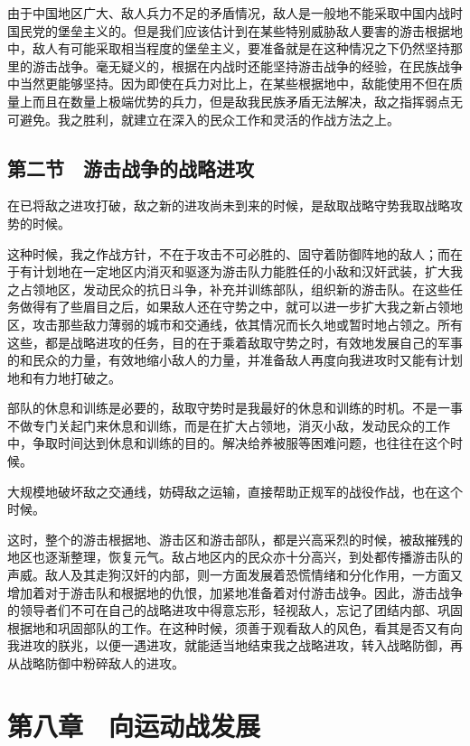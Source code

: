 由于中国地区广大、敌人兵力不足的矛盾情况，敌人是一般地不能采取中国内战时国民党的堡垒主义的。但是我们应该估计到在某些特别威胁敌人要害的游击根据地中，敌人有可能采取相当程度的堡垒主义，要准备就是在这种情况之下仍然坚持那里的游击战争。毫无疑义的，根据在内战时还能坚持游击战争的经验，在民族战争中当然更能够坚持。因为即使在兵力对比上，在某些根据地中，敌能使用不但在质量上而且在数量上极端优势的兵力，但是敌我民族矛盾无法解决，敌之指挥弱点无可避免。我之胜利，就建立在深入的民众工作和灵活的作战方法之上。

\subsection{第二节　游击战争的战略进攻}

在已将敌之进攻打破，敌之新的进攻尚未到来的时候，是敌取战略守势我取战略攻势的时候。

这种时候，我之作战方针，不在于攻击不可必胜的、固守着防御阵地的敌人；而在于有计划地在一定地区内消灭和驱逐为游击队力能胜任的小敌和汉奸武装，扩大我之占领地区，发动民众的抗日斗争，补充并训练部队，组织新的游击队。在这些任务做得有了些眉目之后，如果敌人还在守势之中，就可以进一步扩大我之新占领地区，攻击那些敌力薄弱的城市和交通线，依其情况而长久地或暂时地占领之。所有这些，都是战略进攻的任务，目的在于乘着敌取守势之时，有效地发展自己的军事的和民众的力量，有效地缩小敌人的力量，并准备敌人再度向我进攻时又能有计划地和有力地打破之。

部队的休息和训练是必要的，敌取守势时是我最好的休息和训练的时机。不是一事不做专门关起门来休息和训练，而是在扩大占领地，消灭小敌，发动民众的工作中，争取时间达到休息和训练的目的。解决给养被服等困难问题，也往往在这个时候。

大规模地破坏敌之交通线，妨碍敌之运输，直接帮助正规军的战役作战，也在这个时候。

这时，整个的游击根据地、游击区和游击部队，都是兴高采烈的时候，被敌摧残的地区也逐渐整理，恢复元气。敌占地区内的民众亦十分高兴，到处都传播游击队的声威。敌人及其走狗汉奸的内部，则一方面发展着恐慌情绪和分化作用，一方面又增加着对于游击队和根据地的仇恨，加紧地准备着对付游击战争。因此，游击战争的领导者们不可在自己的战略进攻中得意忘形，轻视敌人，忘记了团结内部、巩固根据地和巩固部队的工作。在这种时候，须善于观看敌人的风色，看其是否又有向我进攻的朕兆，以便一遇进攻，就能适当地结束我之战略进攻，转入战略防御，再从战略防御中粉碎敌人的进攻。

\section{第八章　向运动战发展}

